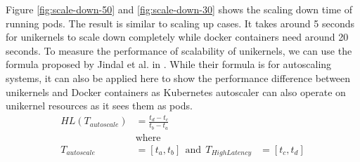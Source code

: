 Figure \ref{fig:scale-down-50} and \ref{fig:scale-down-30} shows the scaling down time of running pods. The result is similar to scaling up cases. It takes around 5 seconds for unikernels to scale down completely while docker containers need around 20 seconds. 
\iffalse
To measure the performance of scalability of unikernels, we can use the formula proposed by Jindal et al. in \cite{multilayered}. While their formula is for autoscaling systems, it can also be applied here to show the performance difference between unikernels and Docker containers as Kubernetes autoscaler can also operate on unikernel resources as it sees them as pods.
\begin{equation*}
  \begin{aligned}
  HL(T_{autoscale})&=\frac{t_d-t_c}{t_b-t_a} \\
  &\textrm{where} \\ 
  T_{autoscale}&=[t_a,t_b] \ \ \textrm{and} \ \ T_{HighLatency}&=[t_c,t_d]
  \end{aligned}
\end{equation*}

